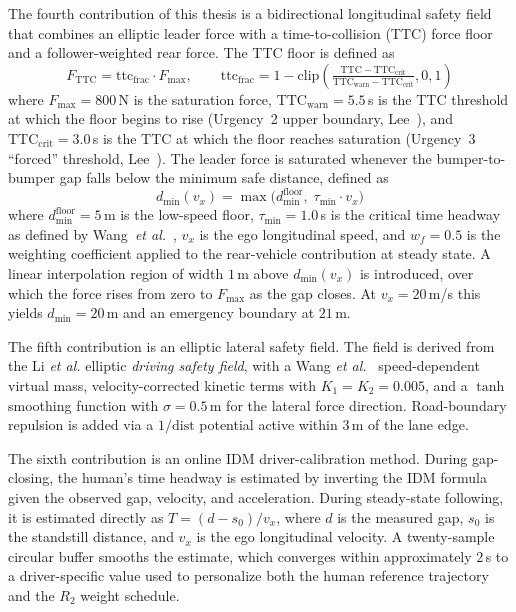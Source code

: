 \documentclass[12pt,a4paper,oneside]{report}
\begin{document}
The fourth contribution of this thesis is a bidirectional longitudinal safety field that
combines an elliptic leader force \cite{liSharedControlNovel2019} with a
time-to-collision (TTC) force floor and a follower-weighted rear force.
The TTC floor is defined as
\begin{equation}
F_{\text{TTC}} = \text{ttc}_{\text{frac}} \cdot F_{\max}, \qquad
\text{ttc}_{\text{frac}} = 1 - \mathrm{clip}\!\left(\tfrac{\mathrm{TTC} - \mathrm{TTC}_{\text{crit}}}{\mathrm{TTC}_{\text{warn}} - \mathrm{TTC}_{\text{crit}}}, 0, 1\right)
\label{eq:ttc_floor}
\end{equation}
where $F_{\max} = 800$\,N is the saturation force, $\mathrm{TTC}_{\text{warn}} = 5.5$\,s
is the TTC threshold at which the floor begins to rise (Urgency~2 upper boundary,
Lee~\cite{hsAnalysesRearEndCrashes2007}), and $\mathrm{TTC}_{\text{crit}} = 3.0$\,s is the TTC at
which the floor reaches saturation (Urgency~3 ``forced'' threshold,
Lee~\cite{hsAnalysesRearEndCrashes2007}).
The leader force is saturated whenever the bumper-to-bumper gap falls below the minimum
safe distance, defined as
\begin{equation}
d_{\min}(v_x) = \max\!\bigl(d_{\min}^{\text{floor}},\; \tau_{\min} \cdot v_x\bigr)
\label{eq:d_min}
\end{equation}
where $d_{\min}^{\text{floor}} = 5$\,m is the low-speed floor, $\tau_{\min} = 1.0$\,s is
the critical time headway as defined by Wang~\emph{et al.}~\cite{wangDrivingSafetyField2016},
$v_x$ is the ego longitudinal speed, and $w_f = 0.5$ is the weighting coefficient applied
to the rear-vehicle contribution at steady state.
A linear interpolation region of width $1$\,m above $d_{\min}(v_x)$ is introduced, over
which the force rises from zero to $F_{\max}$ as the gap closes.
At $v_x = 20$\,m/s this yields $d_{\min} = 20$\,m and an emergency boundary at $21$\,m.

The fifth contribution is an elliptic lateral safety field. The field is derived
from the Li \emph{et al.} \cite{liSharedControlNovel2019} elliptic \emph{driving safety
field}, with a Wang \emph{et al.}\ \cite{wangDrivingSafetyField2015, wangDrivingSafetyField2016}
speed-dependent virtual mass, velocity-corrected kinetic terms with
$K_1 = K_2 = 0.005$, and a $\tanh$ smoothing function with $\sigma = 0.5$\,m for the
lateral force direction. Road-boundary repulsion is added via a
$1/\mathrm{dist}$ potential active within $3$\,m of the lane edge.

The sixth contribution is an online IDM driver-calibration method. During
gap-closing, the human's time headway is estimated by inverting the IDM formula
given the observed gap, velocity, and acceleration. During steady-state following,
it is estimated directly as $T = (d - s_0) / v_x$, where $d$ is the measured gap,
$s_0$ is the standstill distance, and $v_x$ is the ego longitudinal velocity. A
twenty-sample circular buffer smooths the estimate, which converges within
approximately $2$\,s to a driver-specific value used to personalize both the human
reference trajectory and the $R_2$ weight schedule.
\end{document}
